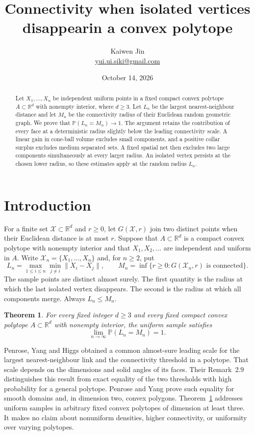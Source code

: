 \documentclass[11pt]{article}
\title{Connectivity when isolated vertices disappear\newline in a convex polytope}
\author{Kaiwen Jin\\\small\href{mailto:yui.ui.siki@gmail.com}{yui.ui.siki@gmail.com}}
\date{October 14, 2026}
\newtheorem{theorem}{Theorem}[section]
\theoremstyle{remark}
\newcommand{\R}{\mathbb R}
\newcommand{\Pp}{\mathbb P}
\begin{document}
\maketitle
\begin{abstract}
Let $X_1,\ldots,X_n$ be independent uniform points in a fixed compact convex
polytope $A\subset\R^d$ with nonempty interior, where $d\geq3$. Let $L_n$ be
the largest nearest-neighbour distance and let $M_n$ be the connectivity
radius of their Euclidean random geometric graph. We prove that
$\Pp(L_n=M_n)\to1$. The argument retains the contribution of every face at a
deterministic radius slightly below the leading connectivity scale. A linear
gain in cone-ball volume excludes small components, and a positive collar
surplus excludes medium separated sets. A fixed spatial net then excludes two
large components simultaneously at every larger radius. An isolated vertex
persists at the chosen lower radius, so these estimates apply at the random
radius $L_n$.
\end{abstract}

\section{Introduction}
For a finite set $\mathcal X\subset\R^d$ and $r\geq0$, let $G(\mathcal X,r)$
join two distinct points when their Euclidean distance is at most $r$.
Suppose that $A\subset\R^d$ is a compact convex polytope with nonempty interior
and that $X_1,X_2,\ldots$ are independent and uniform in $A$. Write
$\mathcal X_n=\{X_1,\ldots,X_n\}$ and, for $n\geq2$, put
\begin{equation}\label{eq:thresholds}
 L_n=\max_{1\leq i\leq n}\min_{j\ne i}\|X_i-X_j\|,
 \qquad
 M_n=\inf\{r\geq0:G(\mathcal X_n,r)\text{ is connected}\}.
\end{equation}
The sample points are distinct almost surely. The first quantity is the
radius at which the last isolated vertex disappears. The second is the
radius at which all components merge. Always $L_n\leq M_n$.

\begin{theorem}\label{thm:main}
For every fixed integer $d\geq3$ and every fixed compact convex polytope
$A\subset\R^d$ with nonempty interior, the uniform sample satisfies
\[
 \lim_{n\to\infty}\Pp(L_n=M_n)=1.
\]
\end{theorem}

Penrose, Yang and Higgs \cite{PYH} obtained a common almost-sure leading
scale for the largest nearest-neighbour link and the connectivity threshold
in a polytope. That scale depends on the dimensions and solid angles of its
faces. Their Remark~2.9 distinguishes this result from exact equality of the
two thresholds with high probability for a general polytope. Penrose and
Yang \cite[Theorem~1.1 and equation~(1.5)]{PY} prove such equality for smooth
domains and, in dimension two, convex polygons. Theorem~\ref{thm:main}
addresses uniform samples in arbitrary fixed convex polytopes of dimension
at least three. It makes no claim about nonuniform densities, higher
connectivity, or uniformity over varying polytopes.
\end{document}
